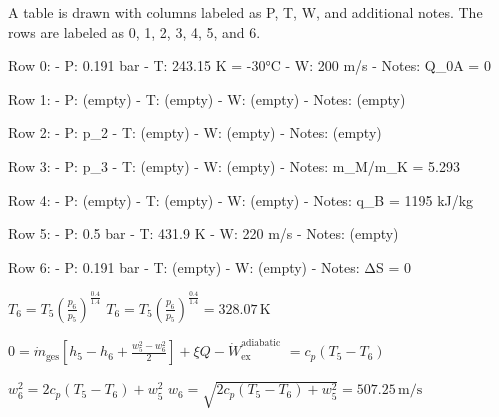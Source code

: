 A table is drawn with columns labeled as P, T, W, and additional notes. The rows are labeled as 0, 1, 2, 3, 4, 5, and 6.  

Row 0:  
- P: 0.191 bar  
- T: 243.15 K = -30°C  
- W: 200 m/s  
- Notes: Q_0A = 0  

Row 1:  
- P: (empty)  
- T: (empty)  
- W: (empty)  
- Notes: (empty)  

Row 2:  
- P: p_2  
- T: (empty)  
- W: (empty)  
- Notes: (empty)  

Row 3:  
- P: p_3  
- T: (empty)  
- W: (empty)  
- Notes: m_M/m_K = 5.293  

Row 4:  
- P: (empty)  
- T: (empty)  
- W: (empty)  
- Notes: q_B = 1195 kJ/kg  

Row 5:  
- P: 0.5 bar  
- T: 431.9 K  
- W: 220 m/s  
- Notes: (empty)  

Row 6:  
- P: 0.191 bar  
- T: (empty)  
- W: (empty)  
- Notes: ΔS = 0

\( T_6 = T_5 \left( \frac{p_6}{p_5} \right)^{\frac{0.4}{1.4}} \)  
\( T_6 = T_5 \left( \frac{p_6}{p_5} \right)^{\frac{0.4}{1.4}} = 328.07 \, \text{K} \)  

\( 0 = \dot{m}_{\text{ges}} \left[ h_5 - h_6 + \frac{w_5^2 - w_6^2}{2} \right] + \xi Q - \dot{W}_{\text{ex}}^{\text{adiabatic}} \)  
\( = c_p (T_5 - T_6) \)  

\( w_6^2 = 2 c_p (T_5 - T_6) + w_5^2 \)  
\( w_6 = \sqrt{2 c_p (T_5 - T_6) + w_5^2} = 507.25 \, \text{m/s} \)